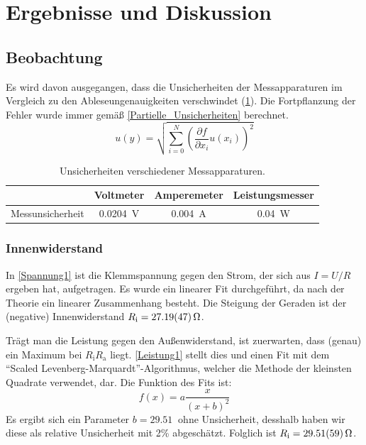 \documentclass[
	a4paper,
	12pt,
	pagesize,
	ngerman
]{scrartcl}
\begin{document}
	\section{Ergebnisse und Diskussion}
	\subsection{Beobachtung}
	Es wird davon ausgegangen, dass die Unsicherheiten der Messapparaturen im Vergleich zu den Ableseungenauigkeiten verschwindet (\cref{Tabelle_Unsicherheiten}).
	Die Fortpflanzung der Fehler wurde immer gemäß \cref{Partielle_Unsicherheiten} berechnet.
	\begin{equation}
		u(y) = \sqrt{  \sum_{i=0}^{N} \left( \frac{\partial f}{\partial x_i}u(x_i)\right)^2  }
		\label{Partielle_Unsicherheiten}
	\end{equation}
	\begin{table}[tb]
		\centering
		\begin{tabular}{ r | c | c | c}
			& Voltmeter & Amperemeter & Leistungsmesser \\ \hline %
			 Messunsicherheit& \SI{0,0204}{V}&  \SI{0,004}{A}&  \SI{0,04}{W}\\

		\end{tabular}
		\caption{Unsicherheiten verschiedener Messapparaturen.} %
		\label{Tabelle_Unsicherheiten} 
	\end{table}
	
	\subsubsection{Innenwiderstand}
	In \cref{Spannung1} ist die Klemmspannung gegen den Strom, der sich aus $I = U/R$ ergeben hat, aufgetragen. 
	Es wurde ein linearer Fit durchgeführt, da nach der Theorie ein linearer Zusammenhang besteht. 
	Die Steigung der Geraden ist der (negative) Innenwiderstand $R_\text{i} = \SI{27,19 \pm 0,47}{\Omega}$.

	Trägt man die Leistung gegen den Außenwiderstand, ist zuerwarten, dass (genau) ein Maximum bei $R_\text{i}  R_\text{a}$ liegt.
	\cref{Leistung1} stellt dies und einen Fit mit dem \enquote{Scaled Levenberg-Marquardt}-Algorithmus, welcher die Methode der kleinsten Quadrate verwendet, dar. 
	Die Funktion des Fits ist:
	\begin{equation}
		f(x)=a\frac{x}{(x+b)^2}
	\end{equation}
	Es ergibt sich ein Parameter $b = \SI{29,51}{}$ ohne Unsicherheit, desshalb haben wir diese als relative Unsicherheit mit 2\% abgeschätzt. 
	Folglich ist $R_\text{i} = \SI{29,51 \pm 0,59}{\Omega}$.
\end{document}
